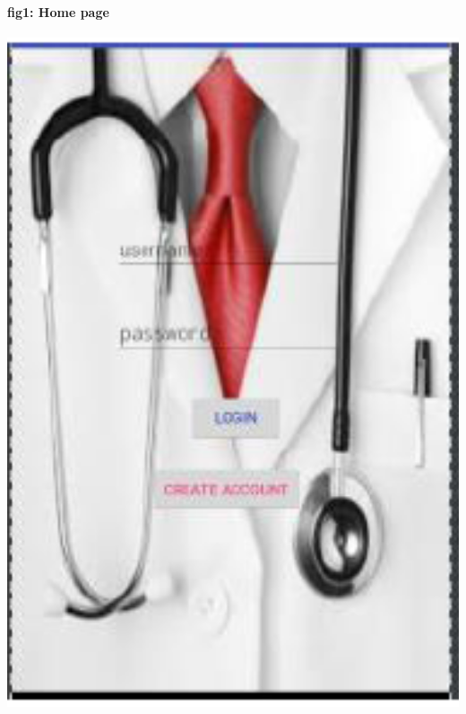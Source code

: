 \documentclass[12pt,]{article}
\begin{document}
\paragraph{fig1: Home page }
\includegraphics[width=1.0\textwidth]{./capture2}\\[0.1in]
\end{document}
